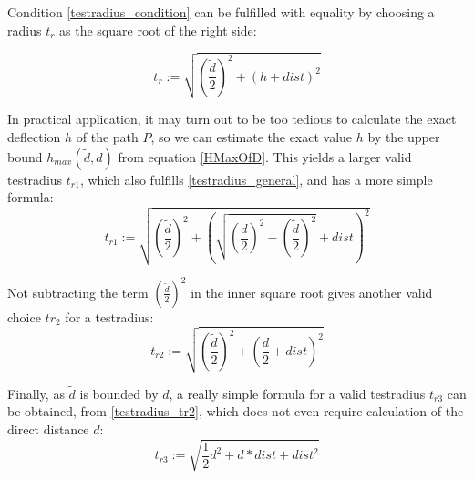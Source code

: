 Condition \ref{testradius_condition} can be fulfilled with equality by choosing a radius $t_{r}$ as the square root of the right side:

\begin{equation}
 \label{testradius_general}
 t_r  := \sqrt{\left(\frac{\tilde{d}}{2}\right)^2 + \left(h+dist\right)^2}
\end{equation}

In practical application, it may turn out to be too tedious to calculate the exact deflection $h$ of 
the path $P$, so we can estimate the exact value $h$ by the upper bound $h_{max}(\tilde{d},d)$ 
from equation \ref{HMaxOfD}. 
This yields a larger valid testradius $t_{r1}$, which also fulfills \ref{testradius_general},
and has a more simple formula:   
\begin{equation}
 \label{testradius_tr1}
  t_{r1} := \sqrt{\left(\frac{\tilde{d}}{2}\right)^2 + \left(\sqrt{ \left(\frac{d}{2}\right)^2 - \left(\frac{\tilde{d}}{2}\right)^2 }+dist\right)^2}
\end{equation}

Not subtracting the term $\left( \frac{\tilde{d}}{2}\right)^2$ in the inner square root gives another  
valid choice $tr_2$ for a testradius:   
\begin{equation}
 \label{testradius_tr2}
  t_{r2} := \sqrt{\left(\frac{\tilde{d}}{2}\right)^2 + \left(\frac{d}{2}+dist\right)^2}
\end{equation}

Finally, as $ \tilde{d}$ is bounded by $ d $, a really simple formula for a valid
testradius $t_{r3}$  can be obtained, from  \ref{testradius_tr2},  
which does not even require calculation of the direct distance $\tilde{d}$:
\begin{equation}
 \label{testradius_tr3}
 t_{r3}  := \sqrt{ \frac{1}{2}d^2 + d*dist + dist^2}
\end{equation}


